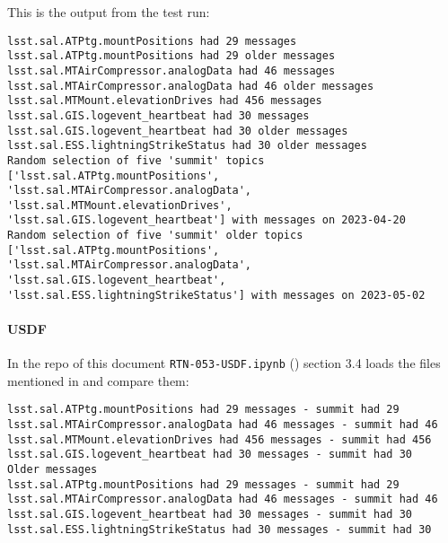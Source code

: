 This is the output from the test run:

\begin{lstlisting}
lsst.sal.ATPtg.mountPositions had 29 messages
lsst.sal.ATPtg.mountPositions had 29 older messages
lsst.sal.MTAirCompressor.analogData had 46 messages
lsst.sal.MTAirCompressor.analogData had 46 older messages
lsst.sal.MTMount.elevationDrives had 456 messages
lsst.sal.GIS.logevent_heartbeat had 30 messages
lsst.sal.GIS.logevent_heartbeat had 30 older messages
lsst.sal.ESS.lightningStrikeStatus had 30 older messages
Random selection of five 'summit' topics ['lsst.sal.ATPtg.mountPositions',
'lsst.sal.MTAirCompressor.analogData', 'lsst.sal.MTMount.elevationDrives',
'lsst.sal.GIS.logevent_heartbeat'] with messages on 2023-04-20
Random selection of five 'summit' older topics ['lsst.sal.ATPtg.mountPositions',
'lsst.sal.MTAirCompressor.analogData', 'lsst.sal.GIS.logevent_heartbeat',
'lsst.sal.ESS.lightningStrikeStatus'] with messages on 2023-05-02
\end{lstlisting}

\paragraph{USDF}
In the repo of this document \texttt{RTN-053-USDF.ipynb} ()  section 3.4
loads the files mentioned in  and compare them:

\begin{lstlisting}
lsst.sal.ATPtg.mountPositions had 29 messages - summit had 29
lsst.sal.MTAirCompressor.analogData had 46 messages - summit had 46
lsst.sal.MTMount.elevationDrives had 456 messages - summit had 456
lsst.sal.GIS.logevent_heartbeat had 30 messages - summit had 30
Older messages
lsst.sal.ATPtg.mountPositions had 29 messages - summit had 29
lsst.sal.MTAirCompressor.analogData had 46 messages - summit had 46
lsst.sal.GIS.logevent_heartbeat had 30 messages - summit had 30
lsst.sal.ESS.lightningStrikeStatus had 30 messages - summit had 30
\end{lstlisting}
